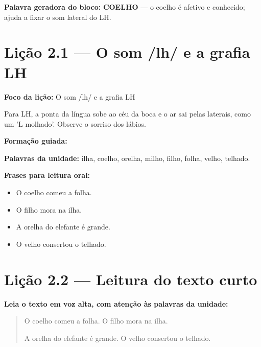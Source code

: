\textbf{Palavra geradora do bloco:} \textbf{COELHO} --- o coelho é afetivo e conhecido; ajuda a fixar o som lateral do LH.

\section{Lição 2.1 --- O som /lh/ e a grafia LH}

\textbf{Foco da lição:} O som /lh/ e a grafia LH


\begin{boquinha}
Para LH, a ponta da língua sobe ao céu da boca e o ar sai pelas laterais, como um 'L molhado'. Observe o sorriso dos lábios.
\end{boquinha}

\noindent\textbf{Formação guiada:}

\begin{center}
\end{center}

\noindent\textbf{Palavras da unidade:} ilha, coelho, orelha, milho, filho, folha, velho, telhado.

\noindent\textbf{Frases para leitura oral:}
\begin{itemize}[leftmargin=1.6em]
  \item O coelho comeu a folha.
  \item O filho mora na ilha.
  \item A orelha do elefante é grande.
  \item O velho consertou o telhado.
\end{itemize}

\section{Lição 2.2 --- Leitura do texto curto}

\noindent\textbf{Leia o texto em voz alta, com atenção às palavras da unidade:}


\begin{quote}
O coelho comeu a folha. O filho mora na ilha.

A orelha do elefante é grande. O velho consertou o telhado.
\end{quote}

